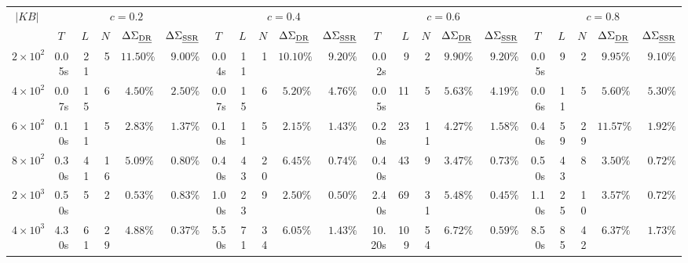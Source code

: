 \documentclass{article}
\begin{document}
\begin{table}
\renewcommand{\arraystretch}{1.2}
  \setlength{\tabcolsep}{4pt}
   \centering
 \resizebox{1.99\columnwidth}{!} {%
  \begin{tabular}{|c||rrrrr|rrrrr|rrrrr|rrrrr|}
  \hline
   \multirow{2}{*}{$|KB|$} & \multicolumn{5}{c|}{$c = 0.2$} & \multicolumn{5}{c|}{$c=0.4$} & \multicolumn{5}{c|}{$c=0.6$} & \multicolumn{5}{c|}{$c=0.8$} \\
    \multicolumn{1}{|c||}{} & \multicolumn{1}{c}{$T$} & $L$ & $N$ & \multicolumn{1}{c}{$\Delta \Sigma_{\text{\emph{DR}}}$} & \multicolumn{1}{c|}{$\Delta \Sigma_{\text{\emph{SSR}}}$} & \multicolumn{1}{c}{$T$} & $L$ & $N$ & \multicolumn{1}{c}{$\Delta \Sigma_{\text{\emph{DR}}}$} & \multicolumn{1}{c|}{$\Delta \Sigma_{\text{\emph{SSR}}}$} & \multicolumn{1}{c}{$T$} & $L$ & $N$ & \multicolumn{1}{c}{$\Delta \Sigma_{\text{\emph{DR}}}$} & \multicolumn{1}{c|}{$\Delta \Sigma_{\text{\emph{SSR}}}$} & \multicolumn{1}{c}{$T$} & $L$ & $N$ & \multicolumn{1}{c}{$\Delta \Sigma_{\text{\emph{DR}}}$} & \multicolumn{1}{c|}{$\Delta \Sigma_{\text{\emph{SSR}}}$}  \\
  \hline
  \hline
  $2 \times 10^2$ & 0.05s & 21 & 5 & $11.50\%$ &$9.00\%$ & 0.04s & 11 & 1 &  $10.10\%$ &$9.20\%$ & 0.02s & 9 & 2 & $9.90\%$ &$9.20\%$ & 0.05s & 9 & 2 & $9.95\%$ &$9.10\%$  \\
  
  $4 \times 10^2$ & 0.07s & 15 & 6 & $4.50\%$ &$2.50\%$ &0.07s & 15 & 6 & $5.20\%$ &$4.76\%$ & 0.05s & 11 & 5 & $5.63\%$ &$4.19\%$ & 0.06s & 11 & 5 & $5.60\%$ &$5.30\%$ \\
  
  $6 \times 10^2$ & 0.10s & 11 & 5 & $2.83\%$ &$1.37\%$ & 0.10s & 11& 5& $2.15\%$ &$1.43\%$ & 0.20s & 23  & 11 & $4.27\%$ &$1.58\%$ & 0.40s & 59 & 29 & $11.57\%$ &$1.92\%$  \\
  
  $8 \times 10^2$ & 0.30s & 41& 16 & $5.09\%$ &$0.80\%$ & 0.40s & 43 & 20 & $6.45\%$ &$0.74\%$ & 0.40s & 43 & 9 & $3.47\%$ &$0.73\%$ & 0.50s & 43 & 8 & $3.50\%$ &$0.72\%$ \\
\hline 
\hline
$2 \times 10^3$ &  0.50s & 5 & 2 & $0.53\%$ &$0.83\%$ & 1.00s & 23 & 9 & $2.50\%$ &$0.50\%$ & 2.40s&  69& 31 & $5.48\%$ &$0.45\%$ & 1.10s & 25 & 10 & $3.57\%$ &$0.72\%$  \\
  
  $4 \times 10^3$ & 4.30s & 61 & 29 & $4.88\%$ &$0.37\%$ & 5.50s & 71 & 34 & $6.05\%$ &$1.43\%$ & 10.20s & 109 & 54 & $6.72\%$ &$0.59\%$ & 8.50s & 85 & 42 &$6.37\%$ &$1.73\%$     \\
  

\end{tabular}}
\end{table}
\end{document}
